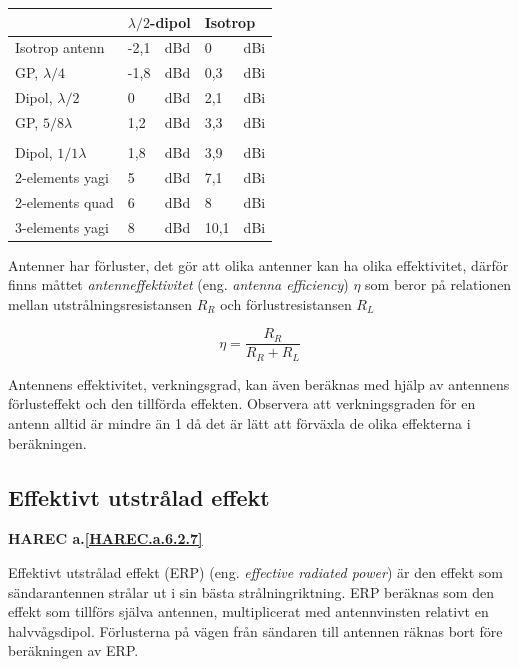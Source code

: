 \begin{tabular}{l|ll|ll}
  & \multicolumn{2}{l|}{\(\lambda/2\)-dipol} &
  \multicolumn{2}{l}{Isotrop} \\
  \hline
  Isotrop antenn       & -2,1 & dBd & 0   & dBi \\
  GP, \(\lambda/4\)    & -1,8 & dBd & 0,3 & dBi \\
  Dipol, \(\lambda/2\) & 0    & dBd & 2,1 & dBi \\
  GP, \(5/8\lambda\)   & 1,2  & dBd & 3,3 & dBi \\
  & & & & \\
  Dipol, \(1/1\lambda\) & 1,8 & dBd & 3,9  & dBi \\
  2-elements yagi       & 5   & dBd & 7,1  & dBi \\
  2-elements quad       & 6   & dBd & 8    & dBi \\
  3-elements yagi       & 8   & dBd & 10,1 & dBi \\
\end{tabular}

Antenner har förluster, det gör att olika antenner kan ha olika
effektivitet, därför finns måttet \emph{antenneffektivitet}
(eng. \emph{antenna efficiency}) \(\eta\) som beror på relationen mellan
utstrålningsresistansen \(R_R\) och förlustresistansen \(R_L\)

\[\eta = \frac{R_R}{R_R+R_L}\]

Antennens effektivitet, verkningsgrad, kan även beräknas med hjälp av antennens
förlusteffekt och den tillförda effekten.
Observera att verkningsgraden för en antenn alltid är mindre än 1 då det är lätt
att förväxla de olika effekterna i beräkningen. 

\subsection{Effektivt utstrålad effekt}
\textbf{
HAREC a.\ref{HAREC.a.6.2.7}\label{myHAREC.a.6.2.7}
}

Effektivt utstrålad effekt (ERP) (eng. \emph{effective radiated power}) är den
effekt som sändarantennen strålar ut i sin bästa strålningriktning.
ERP beräknas som den effekt som tillförs själva antennen, multiplicerat med
antennvinsten relativt en halvvågsdipol.
Förlusterna på vägen från sändaren till antennen räknas bort före beräkningen av
ERP.

